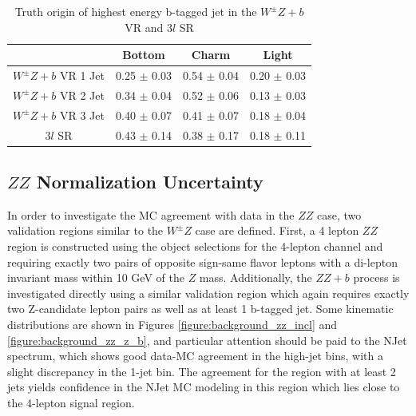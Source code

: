 \begin{table}[htbp]
\centering 
\begin{tabular}{|c|c|c|c|} 
  \hline
  & Bottom  & Charm & Light \\
  \hline
  $W^{\pm}Z+b$ VR 1 Jet& 0.25 $\pm$ 0.03 & 0.54  $\pm$ 0.04 & 0.20 $\pm$ 0.03 \\ 
  $W^{\pm}Z+b$ VR 2 Jet& 0.34 $\pm$ 0.04 & 0.52  $\pm$ 0.06 & 0.13 $\pm$ 0.03 \\ 
  $W^{\pm}Z+b$ VR 3 Jet& 0.40 $\pm$ 0.07 & 0.41  $\pm$ 0.07 & 0.18 $\pm$ 0.04 \\
  3$l$ SR              & 0.43 $\pm$ 0.14 & 0.38  $\pm$ 0.17 & 0.18 $\pm$ 0.11 \\
  \hline 
\end{tabular}
\caption{Truth origin of highest energy b-tagged jet in the $W^{\pm}Z+b$ VR and 3$l$ SR} 
\label{table:wz_truth}
\end{table} 

\subsection{$ZZ$ Normalization Uncertainty}

In order to investigate the MC agreement with data in the $ZZ$ case, two validation regions similar to the $W^{\pm}Z$ case are defined. First, a 4 lepton $ZZ$ region is constructed using the object selections for the 4-lepton channel and requiring exactly two pairs of 
opposite sign-same flavor leptons with a di-lepton invariant mass within 10 GeV of the $Z$ mass. Additionally, the $ZZ+b$ process 
is investigated directly using a similar validation region which again requires exactly two Z-candidate lepton pairs as well as at least 1 b-tagged jet. Some kinematic distributions are shown in Figures \ref{figure:background_zz_incl} and \ref{figure:background_zz_z_b}, and particular attention should be paid to the NJet spectrum, which shows good data-MC agreement in the high-jet bins, with a slight discrepancy in the 1-jet bin. The agreement for the region with at least 2 jets yields confidence in the NJet MC modeling in this region which lies close to the 4-lepton signal region. 

